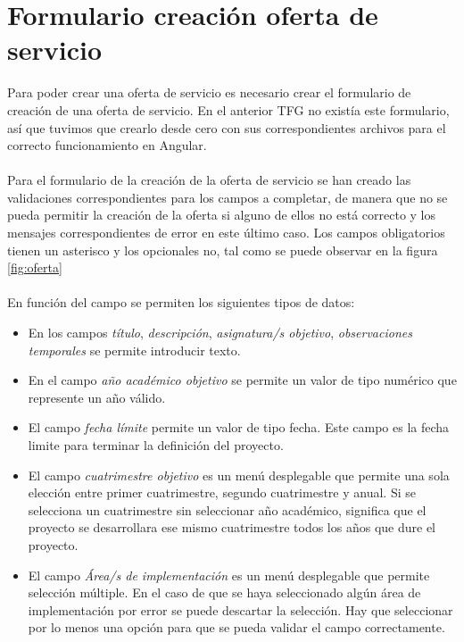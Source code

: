 \documentclass[11pt]{book}
\begin{document}
 \section{Formulario creación oferta de servicio}
 Para poder crear una oferta de servicio es necesario crear el formulario de creación de una oferta de servicio. En el anterior TFG no existía este formulario, así que tuvimos que crearlo desde cero con sus correspondientes archivos para el correcto funcionamiento en Angular.\\\\
 Para el formulario de la creación de la oferta de servicio se han creado las validaciones correspondientes para los campos a completar, de manera que no se pueda permitir la creación de la oferta si alguno de ellos no está correcto y los mensajes correspondientes de error en este último caso. Los campos obligatorios tienen un asterisco y los opcionales no, tal como se puede observar en la figura \ref{fig:oferta}\\\\
 En función del campo se permiten los siguientes tipos de datos: \\
 \begin{itemize} 
 	\item En los campos \emph{título}, \emph{descripción}, \emph{asignatura/s objetivo}, \emph{observaciones temporales} se permite introducir texto.
 	\item En el campo \emph{año académico objetivo} se permite un valor de tipo numérico que represente un año válido.
 	\item El campo \emph{fecha límite} permite un valor de tipo fecha. Este campo es la fecha limite para terminar la definición del proyecto.
 	\item  El campo \emph{cuatrimestre objetivo} es un menú desplegable que permite una sola elección entre primer cuatrimestre, segundo cuatrimestre y anual. Si se selecciona un cuatrimestre sin seleccionar año académico, significa que el proyecto se desarrollara ese mismo cuatrimestre todos los años que dure el proyecto.
 	\item El campo \emph{Área/s de implementación} es un menú desplegable que permite selección múltiple. En el caso de que se haya seleccionado algún área de implementación por error se puede descartar la selección. Hay que seleccionar por lo menos una opción para que se pueda validar el campo correctamente.\\\\
 \end{itemize}
\end{document}
